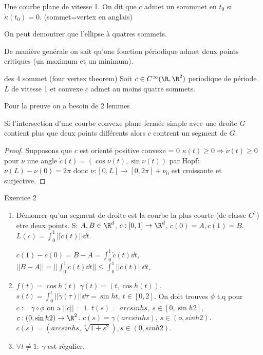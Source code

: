\begin{definition}
	Une courbe plane de vitesse 1. On dit que $c$ admet un sommmet en $t_0$ si $\dot \kappa(t_0)=0$. (sommet=vertex en anglais)
\end{definition}

\begin{examplebox}
	On peut demontrer que l'ellipse à quatres sommets.
\end{examplebox}

\begin{remark}
	De manière genérale on sait qu'one fouction périodique admet deux points critiques (un maximum et un minimum).
\end{remark}

\begin{theorem}{des 4 sommet (four vertex theorem)}
	Soit $c\in C^\infty(\R, \R^2)$ periodique de période $L$ de vitesse 1 et convexe $c$ admet au moins quatre sommets. 
\end{theorem}

Pour la preuve on a besoin de 2 lemmes

\begin{lemme}
	Si l'intersection d'une courbe convexe plane fermée simple avec une droite $G$ contient plus que deux points différents alors $c$ contrent un segment de $G$.
\end{lemme}

\begin{remark}
\end{remark}

\begin{proof}
	Supposons que $c$ est orienté positive convexe = 0 $\kappa(t)\geq 0 \Rightarrow \dot\nu (t)\geq 0$ pour $\nu$ une angle $\dot c(t)=(\cos \nu(t),\sin \nu(t))$ par Hopf: $\nu(L)-\nu(0)=2\pi$ donc $\nu:[0,L]\rightarrow[0,2\pi]+\nu_0$ est croissante et surjective.
\end{proof}

Exercice 2
\begin{enumerate}
	\item Démonrer qu'un segment de droite est la courbe la plus courte (de classe $C^1$) etre deux points.
	S: $A,B\in \R^d$, $c:[0,1]\rightarrow \R^d$, $c(0)=A, c(1)=B$. $L(c)=\int_0^1||\dot c(t)||\dd t$.
	
	$c(1)-c(0)=B-A=\int_0^1\dot c(t)\dd t$, $||B-A||=||\int_0^1\dot c(t)\dd t||\leq \int_0^1||\dot c(t) ||\dd t$.
	\item $f(t)=\cos h (t)$ $\gamma (t)=(t, \cos h (t))$. $s(t)=\int_0^t ||\dot \gamma(\tau)|| \dd \tau=\sin h t,\ t\in[0,2]$. On doit trouves $\phi$ t.q pour $c:=\gamma\circ\phi$ on a $||\dot c||=1$. $t(s)=arcsin h s,\ s\in[0,\sin h 2]$, $c:(0, \sin h 2)\rightarrow \R^2$. $c(s)=\gamma(arcsinh s)$, $s\in(o, sinh 2)$. $c(s)=(arcsin h s, \sqrt[2]{1+s^2}), s\in(0, sin h2)$.
	\item $\forall t\neq 1:\ \gamma$ est régulier.
\end{enumerate}

